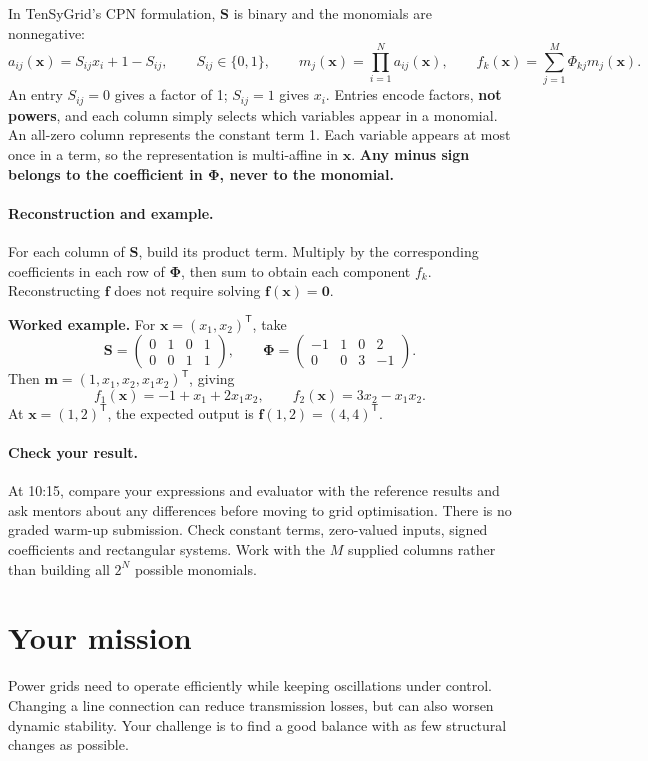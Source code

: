 \documentclass[10pt,a4paper]{article}
\begin{document}
In TenSyGrid's CPN formulation, $\mathbf{S}$ is binary and the monomials are nonnegative:
\[
 a_{ij}(\mathbf x)=S_{ij}x_i+1-S_{ij},\qquad S_{ij}\in\{0,1\},
 \qquad m_j(\mathbf x)=\prod_{i=1}^{N}a_{ij}(\mathbf x),\qquad
 f_k(\mathbf x)=\sum_{j=1}^{M}\Phi_{kj}m_j(\mathbf x).
\]
An entry $S_{ij}=0$ gives a factor of 1; $S_{ij}=1$ gives $x_i$.
Entries encode factors, \textbf{not powers}, and each column simply selects
which variables appear in a monomial. An all-zero column represents the
constant term 1. Each variable appears at most once in a term, so the
representation is multi-affine in $\mathbf x$. \textbf{Any minus sign belongs to
the coefficient in $\boldsymbol{\Phi}$, never to the monomial.}

\paragraph{Reconstruction and example.}
For each column of $\mathbf{S}$, build its product term. Multiply by the corresponding
coefficients in each row of $\boldsymbol{\Phi}$, then sum to obtain each component $f_k$. Reconstructing $\mathbf f$ does not
require solving $\mathbf f(\mathbf x)=\mathbf 0$.

\textbf{Worked example.} For $\mathbf x=(x_1,x_2)^\mathsf T$, take
\[
 \mathbf{S}=\begin{pmatrix}0&1&0&1\\0&0&1&1\end{pmatrix},\qquad
 \boldsymbol{\Phi}=\begin{pmatrix}-1&1&0&2\\0&0&3&-1\end{pmatrix}.
\]
Then $\mathbf m=(1,x_1,x_2,x_1x_2)^\mathsf T$, giving
\[
 \boxed{\quad f_1(\mathbf x)=-1+x_1+2x_1x_2,\qquad
 f_2(\mathbf x)=3x_2-x_1x_2.\quad}
\]
At $\mathbf x=(1,2)^\mathsf T$, the expected output is $\mathbf f(1,2)=(4,4)^\mathsf T$.

\paragraph{Check your result.}
At 10:15, compare your expressions and evaluator with the reference results and
ask mentors about any differences before moving to grid optimisation. There is
no graded warm-up submission. Check constant terms, zero-valued inputs, signed
coefficients and rectangular systems. Work with the $M$ supplied columns rather than
building all $2^N$ possible monomials.

\newpage
\section{Your mission}
Power grids need to operate efficiently while keeping oscillations under control.
Changing a line connection can reduce transmission losses, but can also worsen
dynamic stability. Your challenge is to find a good balance with as few structural
changes as possible.
\end{document}
